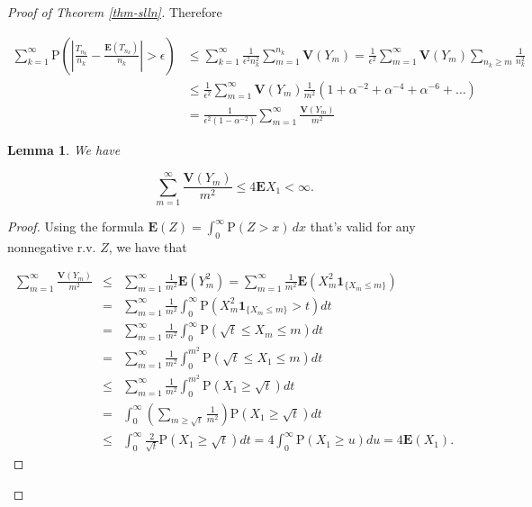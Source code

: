 \documentclass[11pt]{report}
\theoremstyle{plain}
\newtheorem{lem}[thm]{Lemma}
\theoremstyle{definition}
\begin{document}
\begin{proof}[Proof of Theorem \ref{thm-slln}]
Therefore

\begin{align*}
\sum_{k=1}^\infty
\mathrm{P}\left(\left|\frac{T_{n_k}}{n_k} - \frac{\mathbf{E}(T_{n_k})}{n_k}\right| > \epsilon\right)
&\le
\sum_{k=1}^\infty  \frac{1}{\epsilon^2 n_k^2} \sum_{m=1}^{n_k} \mathbf{V}(Y_m)
= \frac{1}{\epsilon^2} \sum_{m=1}^\infty \mathbf{V}(Y_m) \sum_{n_k\ge m} \frac{1}{n_k^2}
\\
&\le
\frac{1}{\epsilon^2} \sum_{m=1}^\infty \mathbf{V}(Y_m) \frac{1}{m^2}(1+\alpha^{-2}+\alpha^{-4}+\alpha^{-6}+\ldots)
\\
&=
\tag{19}\label{eq:infinitesum}
\frac{1}{\epsilon^2(1-\alpha^{-2})} \sum_{m=1}^\infty  \frac{\mathbf{V}(Y_m)}{m^2}
\end{align*}

\begin{lem}
We have

\[
\sum_{m=1}^\infty \frac{\mathbf{V}(Y_m)}{m^2} \le 4 \mathbf{E} X_1 < \infty.
\]

\end{lem}

\begin{proof}
Using the formula
$\mathbf{E}(Z)=\int_0^\infty \mathrm{P}(Z>x)\,dx$
that's valid for any nonnegative r.v. $Z$, we have
that

\begin{eqnarray*}
\sum_{m=1}^\infty \frac{\mathbf{V}(Y_m)}{m^2} &\le& \sum_{m=1}^\infty \frac{1}{m^2} \mathbf{E}(Y_m^2)
=\sum_{m=1}^\infty \frac{1}{m^2}\mathbf{E}\left(X_m^2 \mathbf{1}_{\{X_m\le m\}}\right) \\
&=& \sum_{m=1}^\infty \frac{1}{m^2} \int_0^\infty \mathrm{P}\left(X_m^2 \mathbf{1}_{\{X_m\le m\}}>t\right)dt \\
&=& \sum_{m=1}^\infty \frac{1}{m^2} \int_0^\infty \mathrm{P}\left(\sqrt{t} \le X_m \le m \right)dt \\
&=& \sum_{m=1}^\infty \frac{1}{m^2} \int_0^{m^2} \mathrm{P}\left(\sqrt{t} \le X_1 \le m \right)dt \\
&\le& \sum_{m=1}^\infty \frac{1}{m^2} \int_0^{m^2} \mathrm{P}\left(X_1 \ge \sqrt{t} \right)dt \\
&=& \int_0^\infty \left(\sum_{m\ge \sqrt{t}} \frac{1}{m^2}\right) \mathrm{P}\left(X_1\ge \sqrt{t}\right)dt \\
&\le& \int_0^\infty \frac{2}{\sqrt{t}} \mathrm{P}\left(X_1\ge \sqrt{t}\right)dt = 4 \int_0^\infty \mathrm{P}(X_1\ge u)du = 4\mathbf{E}(X_1).
\end{eqnarray*}


\end{proof}
\end{proof}
\end{document}
